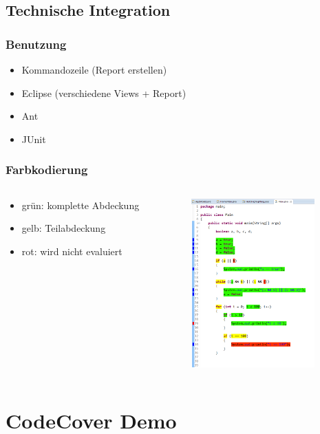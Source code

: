 \documentclass{beamer}
\begin{document}
  \subsection{Technische Integration}
  \begin{frame}\frametitle{Benutzung}
    \begin{itemize}
      \item Kommandozeile (Report erstellen)
      \item Eclipse (verschiedene Views + Report)
      \item Ant
      \item JUnit
    \end{itemize}
  \end{frame}

  \begin{frame}\frametitle{Farbkodierung}
    \begin{columns}
      \begin{column}{5cm}
        \begin{itemize}
          \item grün: komplette Abdeckung
          \item gelb: Teilabdeckung
          \item rot: wird nicht evaluiert
        \end{itemize}
        \vspace{1cm}
      \end{column}
      \begin{column}{5cm}
        \begin{overprint}
          \includegraphics[height=65mm]{pictures/farben.png}
        \end{overprint}
      \end{column}
    \end{columns}
  \end{frame}

  \section{CodeCover Demo}
\end{document}
